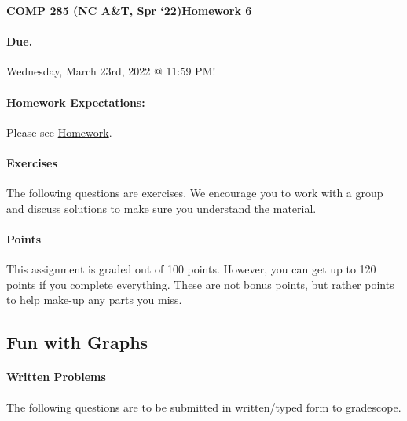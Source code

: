 \documentclass [12pt]{article}
\begin{document}
 

{\LARGE \textbf {COMP 285 (NC A\&T, Spr `22)}\hfill \textbf {Homework 6} } 
\vspace {1em} 
\begin{Instruction} 

\paragraph {Due.} Wednesday, March 23rd, 2022 @ 11:59 PM!
\end{Instruction} 

\vspace {1em} 
\begin{Instruction} \paragraph {Homework Expectations:} Please see \href{https://www.comp285-fall22.ml/homework/#general-homework-information}{Homework}.
\end{Instruction}

\vspace {1em} 
\begin{Instruction} 

\paragraph {Exercises} The following questions are exercises. We encourage you to work with a group and discuss solutions to make sure you understand the material.

\paragraph {Points} This assignment is graded out of 100 points. However, you can get up to 120 points if you complete everything. These are not bonus points, but rather points to help make-up any parts you miss.

\end{Instruction} 

\begin{centering}
\section*{Fun with Graphs}
\end{centering}

\begin{Instruction}

\paragraph{Written Problems} The following questions are to be submitted in written/typed form to gradescope.

\end{Instruction}
\end{document}
